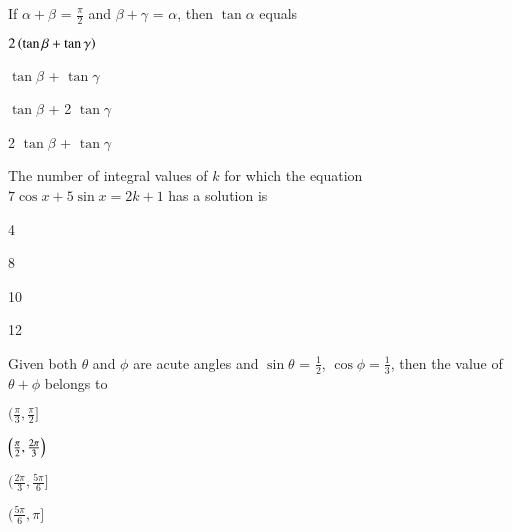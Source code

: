 \iffalse
\title{ASSIGNMENT 1}
\author{EE24BTECH11003 - Akshara Sarma Chennubhatla}
\section{mcq-single}
\fi
\item If $\alpha + \beta$ = $\frac{\pi}{2}$ and $\beta + \gamma$ = $\alpha$, then $\tan \alpha$ equals
\hfill{}
\begin{enumerate}
\begin{multicols}{2}
\item $2\left(\tan \beta + \tan \gamma\right)$
\columnbreak
\item $\tan\beta$ + $\tan\gamma$
\end{multicols}
\begin{multicols}{2}
\item $\tan\beta$ + 2 $\tan\gamma$
\item 2 $\tan\beta$ + $\tan\gamma$
\end{multicols}
\end{enumerate}
\item The number of integral values of $k$ for which the equation $7\cos x + 5\sin x = 2k+1$ has a solution is
\hfill{}
\begin{enumerate}
\begin{multicols}{2}
\item 4
\columnbreak
\item 8
\end{multicols}
\begin{multicols}{2}
\item 10
\columnbreak
\item 12 
\end{multicols}
\end{enumerate}
\item Given both $\theta$ and $\phi$ are acute angles and $\sin\theta$ = $\frac{1}{2}$, $\cos\phi = \frac{1}{3}$, then the value of $\theta + \phi$ belongs to
\hfill{}
\begin{enumerate}
\begin{multicols}{2}
\item $(\frac{\pi}{3},\frac{\pi}{2}]$
\columnbreak
\item $\left(\frac{\pi}{2},\frac{2\pi}{3}\right)$
\end{multicols}
\begin{multicols}{2}
\item $(\frac{2\pi}{3},\frac{5\pi}{6}]$
\columnbreak
\item $(\frac{5\pi}{6},\pi]$
\end{multicols}
\end{enumerate}

